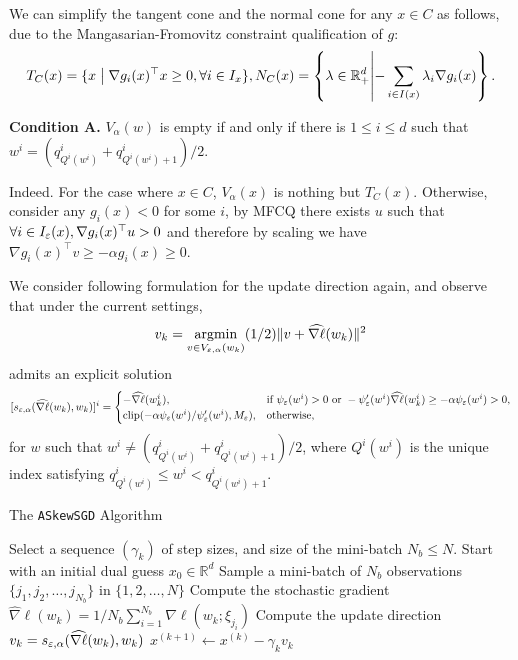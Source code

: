 \documentclass[10pt,a4paper]{article}
\begin{document}


We can simplify the tangent cone and the normal cone for any $x\in C$ as follows, due to the Mangasarian-Fromovitz constraint qualification of $g$: $$T_C(x)=\{x\bigm|\nabla g_i(x)^{\top} x\geq 0, \forall i \in I_x\}, N_C(x)=\left\{\lambda\in \mathbb{R}^d_{+}\middle|-\sum_{i\in I(x)} \lambda_i \nabla g_i(x)\right\}.$$


\noindent\textbf{Condition A.} $V_\alpha(w)$ is empty if and only if there is $1\leq i\leq d$ such that $w^i=(q^i_{Q^i(w^i)}+q^i_{Q^i(w^i)+1})/2$\label{cond1}.

Indeed. For the case where $x\in C$, $V_\alpha(x)$ is nothing but $T_C(x)$. Otherwise, consider any $g_i(x)<0$ for some $i$, by MFCQ there exists $u$ such that $\forall i\in I_\varepsilon(x), \nabla g_i(x)^{\top} u> 0$ and therefore by scaling we have $\nabla g_i(x)^\top v\geq -\alpha g_i(x)\geq 0$.

We consider following formulation for the update direction again, and observe that under the current settings, $$v_{k}=\mathop{\mathrm{argmin}}_{v\in V_{\varepsilon,\alpha}(w_k)}(1/2)\lVert v+\widehat{\nabla\ell}(w_k)\rVert^2$$ admits an explicit solution $$[s_{\varepsilon,\alpha}(\widehat{\nabla\ell}(w_k), w_k)]^i=\begin{cases}-\widehat{\nabla\ell}(w_k^i),& \text{if }\psi_\varepsilon(w^i)>0\text{ or } -\psi'_\varepsilon(w^i)\widehat{\nabla\ell}(w_k^i)\geq -\alpha\psi_\varepsilon(w^i)>0,\\\text{clip}(-\alpha\psi_\varepsilon(w^i)/\psi'_\varepsilon(w^i), M_{\varepsilon}),& \text{otherwise},\end{cases}$$for $w$ such that $w^i\neq (q^i_{Q^i(w^i)}+q^i_{Q^i(w^i)+1})/2$, where $Q^i(w^i)$ is the unique index satisfying $q^i_{Q^i(w^i)}\leq w^i<q^i_{Q^i(w^i)+1}$.

\begin{algorithm}
    \caption{The \texttt{ASkewSGD} Algorithm}\label{alg:cap}
    \begin{algorithmic}[1]
        \State Select a sequence $(\gamma_k)$ of step sizes, and size of the mini-batch $N_b\leq N$.
        \State Start with an initial dual guess $x_0\in \mathbb{R}^d$
        \State Sample a mini-batch of $N_b$ observations $\{j_1, j_2, \ldots, j_{N_b}\}$ in $\{1,2, \ldots, N\}$
        \State Compute the stochastic gradient $\widehat{\nabla}\ell(w_k)=1/N_b \sum_{i=1}^{N_b} \nabla\ell(w_k; \xi_{j_i})$
        \State Compute the update direction $v_k=s_{\varepsilon, \alpha}(\widehat{\nabla\ell}(w_k), w_k)$
        \State $x^{(k+1)}\gets x^{(k)}-\gamma_k v_k$
        \EndFor
    \end{algorithmic}
\end{algorithm}
\end{document}
